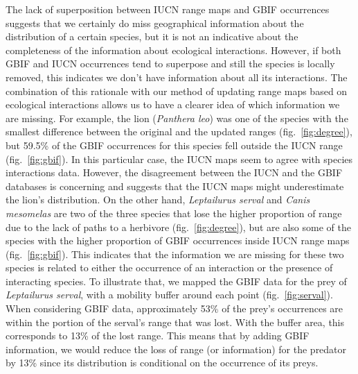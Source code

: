 \documentclass[11pt]{article}
\begin{document}
The lack of superposition between IUCN range maps and GBIF occurrences
suggests that we certainly do miss geographical information about the
distribution of a certain species, but it is not an indicative about the
completeness of the information about ecological interactions. However,
if both GBIF and IUCN occurrences tend to superpose and still the
species is locally removed, this indicates we don't have information
about all its interactions. The combination of this rationale with our
method of updating range maps based on ecological interactions allows us
to have a clearer idea of which information we are missing. For example,
the lion (\emph{Panthera leo}) was one of the species with the smallest
difference between the original and the updated ranges
(fig.~\ref{fig:degree}), but 59.5\% of the GBIF occurrences for this
species fell outside the IUCN range (fig.~\ref{fig:gbif}). In this
particular case, the IUCN maps seem to agree with species interactions
data. However, the disagreement between the IUCN and the GBIF databases
is concerning and suggests that the IUCN maps might underestimate the
lion's distribution. On the other hand, \emph{Leptailurus serval} and
\emph{Canis mesomelas} are two of the three species that lose the higher
proportion of range due to the lack of paths to a herbivore
(fig.~\ref{fig:degree}), but are also some of the species with the
higher proportion of GBIF occurrences inside IUCN range maps
(fig.~\ref{fig:gbif}). This indicates that the information we are
missing for these two species is related to either the occurrence of an
interaction or the presence of interacting species. To illustrate that,
we mapped the GBIF data for the prey of \emph{Leptailurus serval}, with
a mobility buffer around each point (fig.~\ref{fig:serval}). When
considering GBIF data, approximately 53\% of the prey's occurrences are
within the portion of the serval's range that was lost. With the buffer
area, this corresponds to 13\% of the lost range. This means that by
adding GBIF information, we would reduce the loss of range (or
information) for the predator by 13\% since its distribution is
conditional on the occurrence of its preys.
\end{document}
